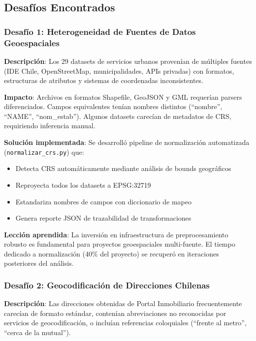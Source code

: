 \subsection{Desafíos Encontrados}

\subsubsection{Desafío 1: Heterogeneidad de Fuentes de Datos Geoespaciales}

\textbf{Descripción}: Los 29 datasets de servicios urbanos provenían de múltiples fuentes (IDE Chile, OpenStreetMap, municipalidades, APIs privadas) con formatos, estructuras de atributos y sistemas de coordenadas inconsistentes.

\textbf{Impacto}: Archivos en formatos Shapefile, GeoJSON y GML requerían parsers diferenciados. Campos equivalentes tenían nombres distintos (``nombre'', ``NAME'', ``nom\_estab''). Algunos datasets carecían de metadatos de CRS, requiriendo inferencia manual.

\textbf{Solución implementada}: Se desarrolló pipeline de normalización automatizada (\texttt{normalizar\_crs.py}) que:
\begin{itemize}
    \item Detecta CRS automáticamente mediante análisis de bounds geográficos
    \item Reproyecta todos los datasets a EPSG:32719
    \item Estandariza nombres de campos con diccionario de mapeo
    \item Genera reporte JSON de trazabilidad de transformaciones
\end{itemize}

\textbf{Lección aprendida}: La inversión en infraestructura de preprocesamiento robusto es fundamental para proyectos geoespaciales multi-fuente. El tiempo dedicado a normalización (40\% del proyecto) se recuperó en iteraciones posteriores del análisis.

\subsubsection{Desafío 2: Geocodificación de Direcciones Chilenas}

\textbf{Descripción}: Las direcciones obtenidas de Portal Inmobiliario frecuentemente carecían de formato estándar, contenían abreviaciones no reconocidas por servicios de geocodificación, o incluían referencias coloquiales (``frente al metro'', ``cerca de la mutual'').

